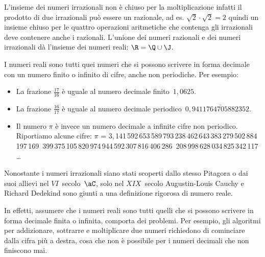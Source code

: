 L'insieme dei numeri irrazionali non è chiuso per la moltiplicazione 
infatti il prodotto di due irrazionali può essere un razionale, ad es. 
\(\sqrt{2} \cdot \sqrt{2} = 2\) quindi un insieme chiuso per le quattro 
operazioni aritmetiche che contenga gli irrazionali deve contenere anche 
i razionali. 
L'unione dei numeri razionali e dei numeri irrazionali dà l'insieme dei 
numeri reali: \(\R=\Q \cup \J\).

I numeri reali sono tutti quei numeri che si possono scrivere in forma 
decimale con un numero finito o infinito di cifre, anche non periodiche.
Per esempio:
\begin{itemize} [noitemsep]
\spazielenx
\item La frazione \(\frac{17}{16}\) è uguale al numero decimale 
finito~\(1,0625\).
\item La frazione \(\frac{16}{17}\) è uguale al numero decimale 
periodico~\(0,\overline{9411764705882352}\).
\item Il numero \(\pi\) è invece un numero decimale a infinite cifre non 
periodico. 
Riportiamo alcune cifre:
\(\pi \) = 
3,\,141\,592\,653\,589\,793\,238\,462\,643\,383\,279\,502\,884\,197\,169\,
399\,375\,105\,820\,974\,944\,592\,307\,816\,406\,286\,
208\,998\,628\,034\,825\,342\,117
\ldots 
\end{itemize}

Nonostante i numeri irrazionali siano stati scoperti dallo stesso Pitagora 
o dai suoi allievi nel \(VI\)~secolo~\(\aC\), solo nel \(XIX\)~secolo 
Augustin-Louis Cauchy e Richard Dedekind sono giunti a una definizione 
rigorosa di numero reale.

In effetti, assumere che i numeri reali sono tutti quelli che si possono 
scrivere in forma decimale finita o infinita,  comporta dei problemi. 
Per esempio, gli algoritmi per addizionare, 
sottrarre e moltiplicare due numeri richiedono di cominciare dalla cifra 
più a destra, cosa che non è possibile per i numeri decimali che non 
finiscono mai. 

